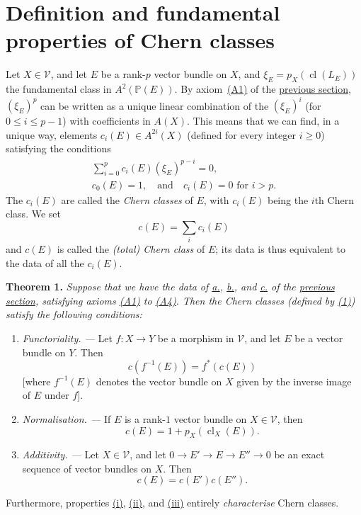 \documentclass{article}
\newenvironment{itenv}[1]
  {\phantomsection\par\medskip\noindent\textbf{#1.}\itshape}
  {\par\medskip}
\renewcommand{\cal}[1]{{\mathcal{#1}}}
\renewcommand{\geq}{\geqslant}
\renewcommand{\leq}{\leqslant}
\DeclareMathOperator{\cl}{cl}
\begin{document}
\section{Definition and fundamental properties of Chern classes}
\label{section3}

Let $X\in\cal{V}$, and let $E$ be a rank-$p$ vector bundle on $X$, and $\xi_E=p_X(\cl(L_E))$ the fundamental class in $A^2(\mathbb{P}(E))$.
By axiom~\hyperref[axiomA1]{(A1)} of the \hyperref[section2]{previous section}, $(\xi_E)^p$ can be written as a unique linear combination of the $(\xi_E)^i$ (for $0\leq i\leq p-1$) with coefficients in $A(X)$.
This means that we can find, in a unique way, elements $c_i(E)\in A^{2i}(X)$ (defined for every integer $i\geq0$) satisfying the conditions
\[
\label{equation1}
  \begin{gathered}
    \sum_{i=0}^p c_i(E)(\xi_E)^{p-i} = 0,
  \\c_0(E)=1,\quad\text{and}\quad c_i(E)=0\mbox{ for $i>p$.}
  \end{gathered}
\tag{1}
\]
The $c_i(E)$ are called the \emph{Chern classes} of $E$, with $c_i(E)$ being the $i$th Chern class.
We set
\[
\label{equation2}
  c(E) = \sum_i c_i(E)
\tag{2}
\]
and $c(E)$ is called the \emph{(total) Chern class} of $E$;
its data is thus equivalent to the data of all the $c_i(E)$.

\begin{itenv}{Theorem 1}
\label{theorem1}
  Suppose that we have the data of \hyperref[dataa]{\rm{a.}}, \hyperref[datab]{\rm{b.}}, and \hyperref[datac]{\rm{c.}} of the \hyperref[section2]{previous section}, satisfying axioms \hyperref[axiomA1]{\rm{(A1)}} to \hyperref[axiomA4]{\rm{(A4)}}.
  Then the Chern classes (defined by \hyperref[equation1]{(1)}) satisfy the following conditions:
  \begin{enumerate}[\rm(i)]
    \item\label{theorem1i}
      \emph{Functoriality. ---}
      Let $f\colon X\to Y$ be a morphism in $\cal{V}$, and let $E$ be a vector bundle on $Y$.
      Then
      \[
      \label{equation3}
        c(f^{-1}(E)) = f^*(c(E))
      \tag{3}
      \]
      [where $f^{-1}(E)$ denotes the vector bundle on $X$ given by the inverse image of $E$ under $f$].
    \item\label{theorem1ii}
      \emph{Normalisation. ---}
      If $E$ is a rank-$1$ vector bundle on $X\in\cal{V}$, then
      \[
      \label{equation4}
        c(E) = 1+p_X(\cl_X(E)).
      \tag{4}
      \]
    \item\label{theorem1iii}
      \emph{Additivity. ---}
      Let $X\in\cal{V}$, and let $0\to E'\to E\to E''\to 0$ be an exact sequence of vector bundles on $X$.
      Then
      \[
      \label{equation5}
        c(E) = c(E')c(E'').
      \tag{5}
      \]
  \end{enumerate}

  Furthermore, properties \hyperref[theorem1i]{\rm{(i)}}, \hyperref[theorem1ii]{\rm{(ii)}}, and \hyperref[theorem1iii]{\rm{(iii)}} entirely \emph{characterise} Chern classes.
\end{itenv}
\end{document}
